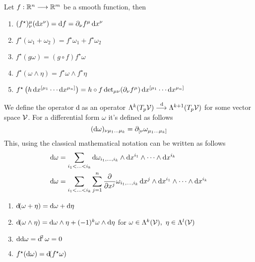 \documentclass[../complete.tex]{subfiles}
\begin{document}
\begin{thm}
	Let $f:\R^n\fto\R^m$ be a smooth function, then
	\begin{enumerate}
	\item $(f^\star)^\mu_\nu(\diff x^\nu)=\diff f=\partial_\nu f^\mu\diff{x^\nu}$
	\item $f^\star(\omega_1+\omega_2)=f^\star\omega_1+f^\star\omega_2$
	\item $f^\star(g\omega)=(g\circ f)f^\star\omega$
	\item $f^\star(\omega\wedge\eta)=f^\star\omega\wedge f^\star\eta$
	\item $f^\star\left( h\diff x^{[\mu_1}\cdots\diff x^{\mu_n]} \right)=h\circ f\det_{\mu\nu}(\partial_\nu f^\mu)\diff x^{[\mu_1}\cdots\diff x^{\mu_n]}$
	\end{enumerate}
\end{thm}
\begin{dfn}
	We define the operator $\diff$ as an operator $\Lambda^k(T_p\V)\fto[\diff]\Lambda^{k+1}(T_p\V)$ for some vector space $\V$. For a differential form $\omega$ it's defined as follows
	\begin{equation}
		(\diff\omega)_{\nu\mu_1\ldots\mu_k}=\del_{[\nu}\omega_{\mu_1\ldots\mu_k]}
		\label{eq:exteriorderivative}
	\end{equation}
	This, using the classical mathematical notation can be written as follows
	\begin{equation}
		\begin{aligned}
			\diff{\omega}&=\sum_{i_1<\ldots<i_k}\diff{\omega_{i_1,\ldots,i_k}}\wedge\diff{x^{i_1}}\wedge\cdots\wedge\diff{x^{i_k}}\\
			\diff{\omega}&=\sum_{i_1<\ldots<i_k}\sum_{j=1}^n\pdv{x^j}\omega_{i_1,\ldots,i_k}\diff{x^j}\wedge\diff{x^{i_1}}\wedge\cdots\wedge\diff{x^{i_k}}
		\end{aligned}
		\label{eq:diffdform}
	\end{equation}
\end{dfn}
\begin{thm}[Properties of $d$]
	\begin{enumerate}
	\item $\diff(\omega+\eta)=\diff\omega+\diff\eta$
	\item $\diff(\omega\wedge\eta)=\diff\omega\wedge\eta+(-1)^k\omega\wedge\diff\eta$ for $\omega\in\Lambda^k(\V),\ \eta\in\Lambda^l(\V)$
	\item $\diff\diff\omega=\diff^2\omega=0$
	\item $f^\star(\diff\omega)=\diff(f^\star\omega)$
	\end{enumerate}
\end{thm}
\end{document}
